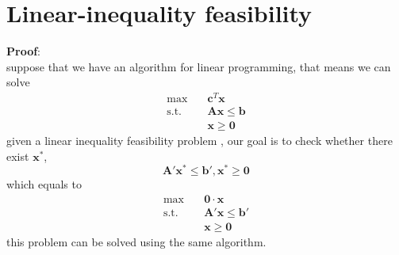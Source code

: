 \section{Linear-inequality feasibility}
 \textbf{Proof}:\\
 \indent suppose that we have an algorithm for linear programming, that means we can solve
 \[ \begin{split} 
	 \max \quad &\bm{c}^T\bm{x} \\
	 \text{s.t.}\quad & \bm{Ax} \leq \bm{b} \\
	 & \bm{x} \geq \bm{0}
	\end{split} 
 \]
given a linear inequality feasibility problem , our goal is to check whether there exist  $\bm{x}^*$, 
\[
	\bm{A}' \bm{x}^* \leq \bm{b}', \bm{x}^* \geq \bm{0}
\]
which equals to 
\[ \begin{split} 
	\max \quad & \bm{0}\cdot \bm{x} \\
	\text{s.t.}\quad & \bm{A}'\bm{x} \leq \bm{b}' \\
	& \bm{x} \geq \bm{0}
   \end{split}		
\]
this problem can be solved using the same algorithm.